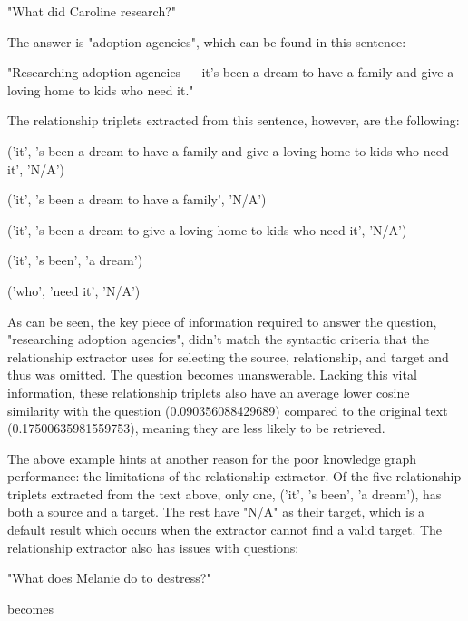 \begin{displayquote}
"What did Caroline research?"
\end{displayquote}

\noindent The answer is "adoption agencies", which can be found in this sentence:

\begin{displayquote}
"Researching adoption agencies — it's been a dream to have a family and give a loving home to kids who need it."
\end{displayquote}

\noindent The relationship triplets extracted from this sentence, however, are the following:

\begin{displayquote}
('it', 's been a dream to have a family and give a loving home to kids who need it', 'N/A')

('it', 's been a dream to have a family', 'N/A')

('it', 's been a dream to give a loving home to kids who need it', 'N/A')

('it', 's been', 'a dream')

('who', 'need it', 'N/A')
\end{displayquote}

\noindent As can be seen, the key piece of information required to answer the question, "researching adoption agencies", didn't match the syntactic criteria that the relationship extractor uses for selecting the source, relationship, and target and thus was omitted. The question becomes unanswerable. Lacking this vital information, these relationship triplets also have an average lower cosine similarity with the question (0.090356088429689) compared to the original text (0.17500635981559753), meaning they are less likely to be retrieved.

The above example hints at another reason for the poor knowledge graph performance: the limitations of the relationship extractor. Of the five relationship triplets extracted from the text above, only one, ('it', 's been', 'a dream'), has both a source and a target. The rest have "N/A" as their target, which is a default result which occurs when the extractor cannot find a valid target. The relationship extractor also has issues with questions:

\begin{displayquote}
"What does Melanie do to destress?"
\end{displayquote}

\noindent becomes

